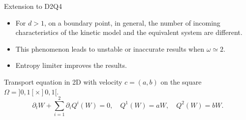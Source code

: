 \documentclass[english]{beamer}
\begin{document}
%
\begin{frame}{Extension to D2Q4}
\begin{itemize}
\item For $d>1$, on a boundary point, in general, the number of incoming characteristics
of the kinetic model and the equivalent system are different.
\item This phenomenon leads to unstable or inaccurate results when $\omega\simeq2$.
\item Entropy limiter improves the results.
\end{itemize}
Transport equation in 2D with velocity $c=(a,b)$ on the square $\Omega=]0,1[\times]0,1[$.
\[
\partial_{t}W+\sum_{i=1}^{2}\partial_{i}Q^{i}(W)=0,\quad Q^{1}(W)=aW,\quad Q^{2}(W)=bW.
\]

\end{frame}
\end{document}
